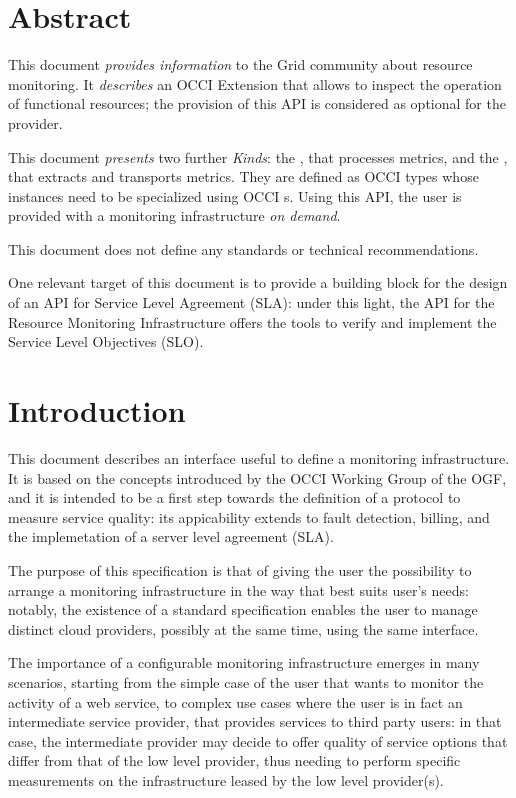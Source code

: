 \documentclass[12pt]{article}  %
\begin{document}
\section*{Abstract}

This document {\em provides information} to the Grid community about resource monitoring. It {\em describes} an OCCI Extension that allows to inspect the operation of functional resources; the provision of this API is considered as optional for the provider.

This document {\em presents} two further {\em Kinds}: the \sens, that processes metrics, and the \coll, that extracts and transports metrics. They are defined as OCCI types whose instances need to be specialized using OCCI \mi s. Using this API, the user is provided with a monitoring infrastructure {\em on demand}.

This document does not define any standards or technical recommendations.

One relevant target of this document is to provide a building block for the design of an API for Service Level Agreement (SLA): under this light, the API for the Resource Monitoring Infrastructure offers the tools to verify and implement the Service Level Objectives (SLO).

\tableofcontents

\newpage

\section{Introduction}

This document describes an interface useful to define a monitoring infrastructure. It is based on the concepts introduced by the OCCI Working Group of the OGF, and it is intended to be a first step towards the definition of a protocol to measure service quality: its appicability extends to fault detection, billing, and the implemetation of a server level agreement (SLA).

The purpose of this specification is that of giving the user the possibility to arrange a monitoring infrastructure in the way that best suits user's needs: notably, the existence of a standard specification enables the user to manage distinct cloud providers, possibly at the same time, using the same interface.

The importance of a configurable monitoring infrastructure emerges in many scenarios, starting from the simple case of the user that wants to monitor the activity of a web service, to complex use cases where the user is in fact an intermediate service provider, that provides services to third party users: in that case, the intermediate provider may decide to offer quality of service options that differ from that of the low level provider, thus needing to perform specific measurements on the infrastructure leased by the low level provider(s).
\end{document}
